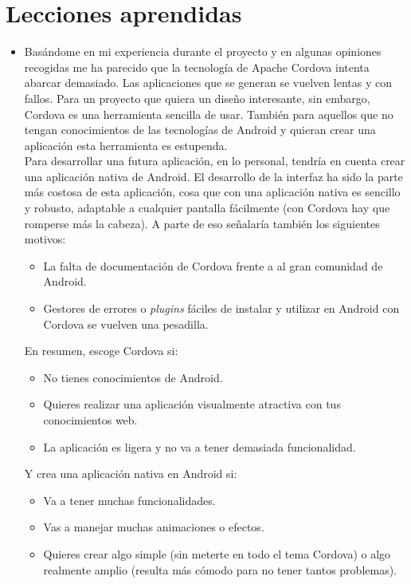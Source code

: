 \section{Lecciones aprendidas}

\begin{itemize}
\item Basándome en mi experiencia durante el proyecto y en algunas opiniones recogidas me ha parecido que la tecnología de Apache Cordova intenta abarcar demasiado. Las aplicaciones que se generan se vuelven lentas y con fallos. Para un proyecto que quiera un diseño interesante, sin embargo, Cordova es una herramienta sencilla de usar. También para aquellos que no tengan conocimientos de las tecnologías de Android y quieran crear una aplicación esta herramienta es estupenda.\\

Para desarrollar una futura aplicación, en lo personal, tendría en cuenta crear una aplicación nativa de Android. El desarrollo de la interfaz ha sido la parte más costosa de esta aplicación, cosa que con una aplicación nativa es sencillo y robusto, adaptable a cualquier pantalla fácilmente (con Cordova hay que romperse más la cabeza). A parte de eso señalaría también los siguientes motivos:
\begin{itemize}
\item La falta de documentación de Cordova frente a al gran comunidad de Android.
\item Gestores de errores o \textit{plugins} fáciles de instalar y utilizar en Android con Cordova se vuelven una pesadilla.
\end{itemize}
En resumen, escoge Cordova si:
\begin{itemize}
\item No tienes conocimientos de Android.
\item Quieres realizar una aplicación visualmente atractiva con tus conocimientos web.
\item La aplicación es ligera y no va a tener demasiada funcionalidad.
\end{itemize}
Y crea una aplicación nativa en Android si:
\begin{itemize}
\item Va a tener muchas funcionalidades.
\item Vas a manejar muchas animaciones o efectos.
\item Quieres crear algo simple (sin meterte en todo el tema Cordova) o algo realmente amplio (resulta más cómodo para no tener tantos problemas).
\end{itemize}
\end{itemize}